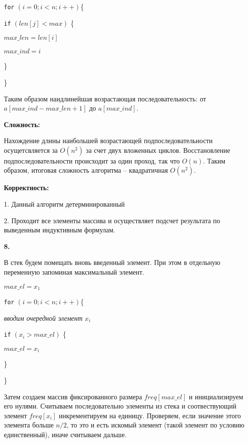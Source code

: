 \documentclass[12pt]{extreport}
\begin{document}
	{\tt for} $(i=0; i<n; i++) $\{
	
	\hspace{4 mm} 	{\tt if} $ (len[j] < max)$ \{
	
	\hspace{8 mm} $max\_len = len[i]$

	\hspace{8 mm} $max\_ind = i$
	
	\hspace{4 mm} \}
	
	\}
	
	Таким образом наидлинейшая возрастающая последовательность:  от $a[max\_ind - max\_len + 1]$  до $a[max\_ind]$. 
	
	\bigskip
	
	{\bf Сложность:}
	
	Нахождение длины наибольшей возрастающей подпоследовательности осущетсвляется за $O(n^2)$ за счет двух вложенных циклов. Восстановление подпоследовательности происходит за один проход, так что $O(n)$. Таким образом, итоговая сложность алгоритма -- квадратичная $O(n^2)$.
	
	\bigskip
	
	{\bf Корректность:}
	
	1. Данный алгоритм детерминированный
	
	2. Проходит все элементы массива и осуществляет подсчет результата по выведенным индуктивным формулам. 
	
	\bigskip
	
	{\bf 8.}	
	
	В стек будем помещать вновь введенный элемент. При этом в отдельную переменную запоминая максимальный элемент. 
	
	$ max\_el = x_1$
	
	{\tt for} $(i=0; i<n; i++) $\{
	
	\hspace{4 mm} \textit{ вводим очередной элемент $x_i$}
	
	\hspace{4 mm} 	{\tt if} $ (x_i > max\_el)$ \{
	
	\hspace{8 mm} $max\_el = x_i $
	
	\hspace{4 mm} \}
	
	\}
	
	Затем создаем массив фиксированного размера $ freq[max\_el]$ и инициализируем его нулями. Считываем последовательно элементы из стека и соотвествующий элемент $ freq[x_i]$ инкрементируем на единицу. Проверяем, если значение этого элемента больше $n/2$, то это и есть искомый элемент (такой элемент по условию единственный), иначе считываем дальше. 
	
\end{document}
